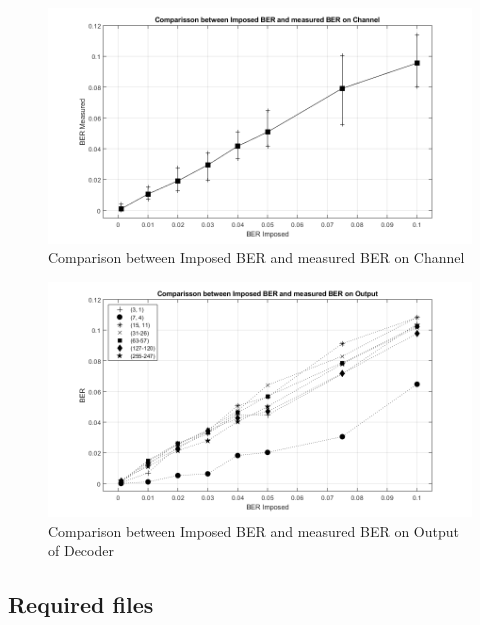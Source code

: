 \begin{refsection}
\begin{figure}[h!]
	\vspace{-4mm}
	\centering
	\includegraphics[width=.9\linewidth]{./sdf/eit_25828_hamming_channel_encoder_decoder/images/BER_1.png}
	\vspace{-5mm}
	\caption{Comparison between Imposed BER and measured BER on Channel}
	\label{fig:hammingEncoderDecoder_BER_input_output_channel}
\end{figure}

\begin{figure}[h!]
	\vspace{-9mm}
	\centering
	\includegraphics[width=.9\linewidth]{./sdf/eit_25828_hamming_channel_encoder_decoder/images/BER_2.png}
	\vspace{-5mm}
	\caption{Comparison between Imposed BER and measured BER on Output of Decoder}
	\label{fig:hammingEncoderDecoder_BER_input_output}
	\vspace{-30mm}
\end{figure}

\subsection*{Required files}
\label{Required files}


\end{refsection}

